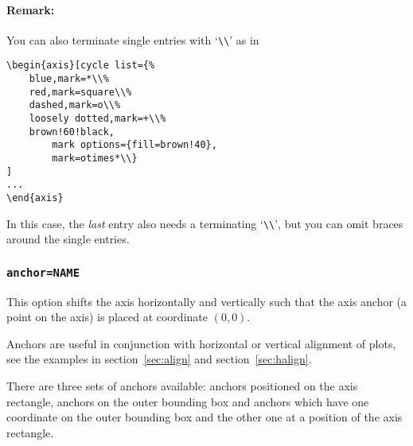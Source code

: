 \paragraph{Remark:} You can also terminate single entries with `\lstinline!\\!' as in
\begin{lstlisting}
\begin{axis}[cycle list={%
	blue,mark=*\\%
	red,mark=square\\%
	dashed,mark=o\\%
	loosely dotted,mark=+\\%
	brown!60!black,
		mark options={fill=brown!40},
		mark=otimes*\\}
]
...
\end{axis}
\end{lstlisting}
In this case, the \emph{last} entry also needs a terminating `\lstinline!\\!', but you can omit braces around the single entries.

\subsubsection{\texttt{anchor=NAME}}
\label{option:anchor}%
This option shifts the axis horizontally and vertically such that the axis anchor (a point on the axis) is placed at coordinate $(0,0)$.

Anchors are useful in conjunction with horizontal or vertical alignment of plots, see the examples in section~\ref{sec:align} and section~\ref{sec:halign}.

There are three sets of anchors available: anchors positioned on the axis rectangle, anchors on the outer bounding box and anchors which have one coordinate on the outer bounding box and the other one at a position of the axis rectangle.

